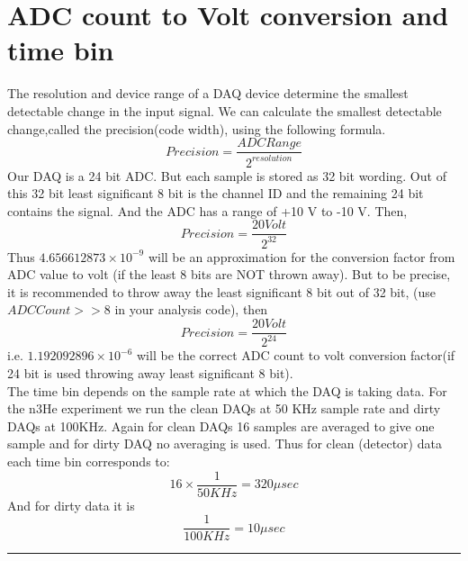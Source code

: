 \documentclass[12pt]{article}
\begin{document}
\section{ADC count to Volt conversion and time bin}
The resolution and device range of a DAQ device determine the smallest
detectable change in the input signal. We can calculate the smallest
detectable change,called the precision(code width), using the following formula.
$$Precision =\frac{ADC Range}{2^{resolution}}$$
Our DAQ is a 24 bit ADC. But each sample is stored as 32 bit wording. Out of this 32 bit least significant 8 bit is the channel ID and the remaining 24 bit contains the signal. And the ADC has a range of +10 V to -10 V. Then, 
$$Precision =\frac{20 Volt}{2^{32}}$$
Thus $4.656612873\times10^{-9}$ will be an approximation for the conversion factor from ADC value to volt (if the least 8 bits are NOT thrown away). But to be precise, it is recommended to throw away the least significant 8 bit out of 32 bit, (use $ADC Count>>8$ in your analysis code), then \\
$$Precision =\frac{20 Volt}{2^{24}}$$
i.e. $1.192092896\times10^{-6}$ will be the correct ADC count to volt conversion factor(if 24 bit is used throwing away least significant 8 bit).\\

The time bin depends on the sample rate at which the DAQ is taking data. For the n3He experiment we run the clean DAQs at 50 KHz sample rate and dirty DAQs at 100KHz. Again for clean DAQs 16 samples are averaged to give one sample and for dirty DAQ no averaging is used. Thus for clean (detector) data each time bin corresponds to: 
$$16\times\frac{1}{50KHz}=320\mu sec$$
And for dirty data it is 
$$\frac{1}{100KHz} = 10 \mu sec$$

\noindent
{\color{red} \rule{\linewidth}{1mm} }
 
\newpage
\end{document}
